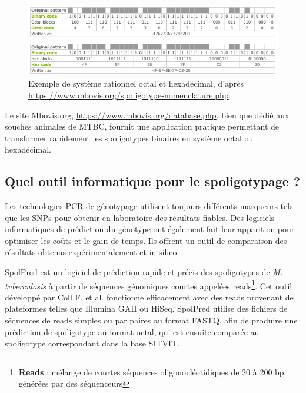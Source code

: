 \documentclass[twoside,a4paper,11pt,frenchb,openany]{report}
\begin{document}
\begin{figure}[h!]
\centering
\includegraphics[scale=0.6]{hexa.png}
\caption{Exemple de système rationnel octal et hexadécimal, d'après\\ \url{https://www.mbovis.org/spoligotype-nomenclature.php}}
\end{figure}

Le site Mbovis.org, \url{https://www.mbovis.org/database.php}, bien que dédié aux souches animales de MTBC, fournit une application pratique permettant de transformer rapidement les spoligotypes binaires en système octal ou hexadécimal.


\subsection{Quel outil informatique pour le spoligotypage ?}

Les technologies PCR de génotypage utilisent toujours différents marqueurs tels que les SNPs pour obtenir en laboratoire des résultats fiables. Des logiciels informatiques de prédiction du génotype ont également fait leur apparition pour optimiser les coûts et le gain de temps. Ils offrent un outil de comparaison des résultats obtenus expérimentalement et in silico.

SpolPred est un logiciel de prédiction rapide et précis des spoligotypes de \textit{M. tuberculosis} à partir de séquences génomiques courtes appelées reads\footnote{\textbf{Reads} : mélange de courtes séquences oligonocléotidiques de 20 à 200 bp générées par des séquenceurs}. Cet outil développé par Coll F. et al. fonctionne efficacement avec des reads provenant de plateformes telles que Illumina GAII ou HiSeq. SpolPred utilise des fichiers de séquences de reads simples ou par paires au format FASTQ, afin de produire une prédiction de spoligotype au format octal, qui est ensuite comparée au spoligotype correspondant dans la base SITVIT.
\end{document}
